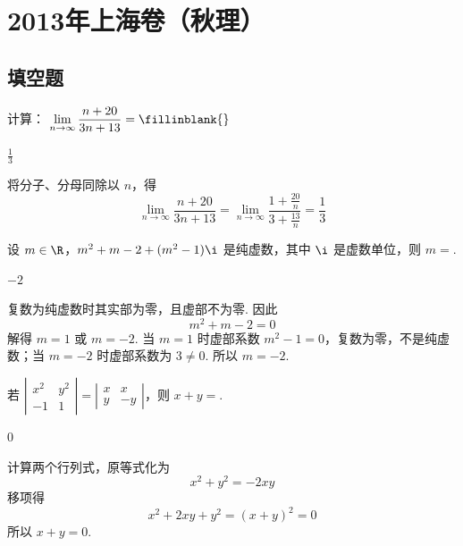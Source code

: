 \chapter{2013年上海卷（秋理）}

\section{填空题}

\begin{problem}
计算： \(\displaystyle\lim_{n\to\infty}\frac{n+20}{3n+13}=\fillinblank{}\)
\begin{answer}
\(\frac{1}{3}\)
\end{answer}

\begin{solution}
将分子、分母同除以 \(n\)，得
\[
\lim_{n\to\infty}\frac{n+20}{3n+13}
=\lim_{n\to\infty}\frac{1+\frac{20}{n}}{3+\frac{13}{n}}
=\frac{1}{3}
\]
\end{solution}
\end{problem}

\begin{problem}
设 \(m \in \R\)，\(m^2 + m - 2 + (m^2 - 1)\i\) 是纯虚数，其中 \(\i\) 是虚数单位，则 \(m=\)\fillinblank{}.
\begin{answer}
\(-2\)
\end{answer}

\begin{solution}
复数为纯虚数时其实部为零，且虚部不为零. 因此
\[
m^2+m-2=0
\]
解得 \(m=1\) 或 \(m=-2\). 当 \(m=1\) 时虚部系数 \(m^2-1=0\)，复数为零，不是纯虚数；当 \(m=-2\) 时虚部系数为 \(3\ne0\). 所以 \(m=-2\).
\end{solution}
\end{problem}

\begin{problem}
若 \(\left|\begin{matrix}x^2 & y^2 \\ -1 & 1\end{matrix}\right| = \left|\begin{matrix}x & x \\ y & -y\end{matrix}\right|\)，则 \(x+y=\)\fillinblank{}.
\begin{answer}
\(0\)
\end{answer}

\begin{solution}
计算两个行列式，原等式化为
\[
x^2+y^2=-2xy
\]
移项得
\[
x^2+2xy+y^2=(x+y)^2=0
\]
所以 \(x+y=0\).
\end{solution}
\end{problem}


